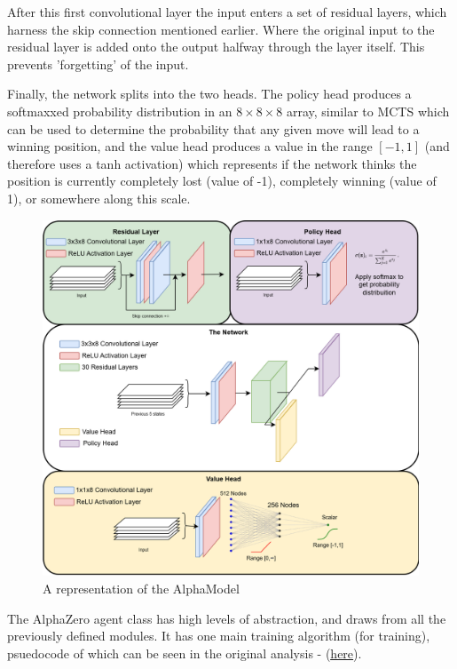 \documentclass{article}
\makeatletter
\newcommand\subsubsubsection{\@startsection{paragraph}{4}{\z@}{-2.5ex\@plus -1ex \@minus -.25ex}{1.25ex \@plus .25ex}{\normalfont\normalsize\bfseries}}
\newcommand{\myhy}[2]{\hyperref[#1]{\color{black}\setulcolor{black}\ul{#2}}}
\makeatother
\begin{document}
    After this first convolutional layer the input enters a set of residual layers, which harness the skip connection mentioned earlier. Where the original
    input to the residual layer is added onto the output halfway through the layer itself. This prevents 'forgetting' of the input.

    Finally, the network splits into the two heads. The policy head produces a softmaxxed probability distribution in an $8\times8\times8$ array, similar to MCTS
    which can be used to determine the probability that any given move will lead to a winning position, and the value head produces a value in the range $[-1, 1]$
    (and therefore uses a tanh activation) which represents if the network thinks the position is currently completely lost (value of -1), completely winning (value of 1),
    or somewhere along this scale.

    \begin{figure}
        \centering
        \includegraphics[scale=0.45]{NetworkPassThrough.drawio.png}
        \caption{A representation of the AlphaModel} 
        \label{fig:28}
    \end{figure}

    \pagebreak
    \subsubsubsection{Agent}

    The AlphaZero agent class has high levels of abstraction, and draws from all the previously defined modules.
    It has one main training algorithm (for training), psuedocode of which can be seen in the original analysis - (\myhy{AgentTrainingAlg}{here}). 
\end{document}

